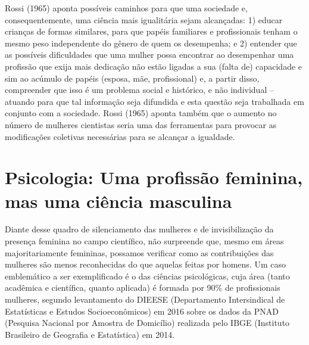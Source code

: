 Rossi (1965) aponta possíveis caminhos para que uma sociedade e, consequentemente, uma ciência mais igualitária sejam alcançadas: 1) educar crianças de formas similares, para que papéis familiares e profissionais tenham o mesmo peso independente do gênero de quem os desempenha; e 2) entender que as possíveis dificuldades que uma mulher possa encontrar ao desempenhar uma profissão que exija mais dedicação não estão ligadas a sua (falta de) capacidade e sim ao acúmulo de papéis (esposa, mãe, profissional) e, a partir disso, compreender que isso é um problema social e histórico, e não individual – atuando para que tal informação seja difundida e esta questão seja trabalhada em conjunto com a sociedade. Rossi (1965) aponta também que o aumento no número de mulheres cientistas seria uma das ferramentas para provocar as modificações coletivas necessárias para se alcançar a igualdade.

\section*{Psicologia: Uma profissão feminina, mas uma ciência masculina}

Diante desse quadro de silenciamento das mulheres e de invisibilização da presença feminina no campo científico, não surpreende que, mesmo em áreas majoritariamente femininas, possamos verificar como as contribuições das mulheres são menos reconhecidas do que aquelas feitas por homens. Um caso emblemático a ser exemplificado é o das ciências psicológicas, cuja área (tanto acadêmica e científica, quanto aplicada) é formada por 90\% de profissionais mulheres, segundo levantamento do DIEESE (Departamento Intersindical de Estatísticas e Estudos Socioeconômicos) em 2016 sobre os dados da PNAD (Pesquisa Nacional por Amostra de Domicílio) realizada pelo IBGE (Instituto Brasileiro de Geografia e Estatística) em 2014.

